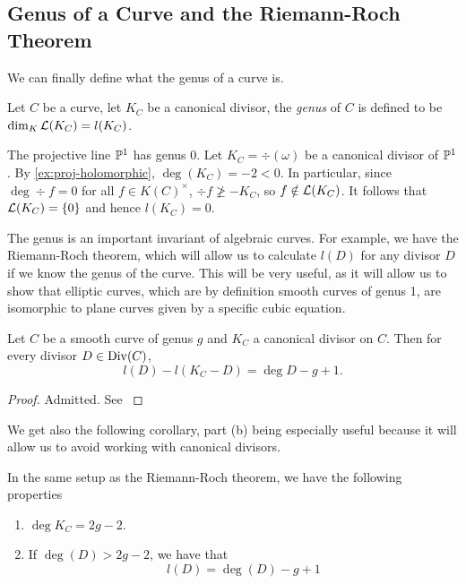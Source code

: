 \subsection{Genus of a Curve and the Riemann-Roch Theorem}

We can finally define what the genus of a curve is.
\begin{definition}
	Let $C$ be a curve, let $K_C$ be a canonical divisor,
	the \emph{genus} of $C$ is defined to be $\dim_K \mathcal{L}(K_C) = l(K_C)$.
\end{definition}

\begin{example}
	\label{ex:proj-genus}
	The projective line $\mathbb{P}^1$ has genus 0.
	Let $K_C = \div(\omega)$ be a canonical divisor of $\mathbb{P}^1$.
	By \ref{ex:proj-holomorphic}, $\deg(K_C) = -2 < 0$. In particular, 
	since $\deg \div f = 0$ for all $f \in K(C)^\times$,
	$\div f \not\geq -K_C$,
	so $f \notin \mathcal{L}(K_C)$. It follows that $\mathcal{L}(K_C) = \{0\}$ and
	hence $l(K_C) = 0$.
\end{example}

The genus is an important invariant of algebraic curves.
For example, we have the Riemann-Roch theorem, which will
allow us to calculate $l(D)$ for any divisor $D$ if we know the genus of
the curve.
This will be very useful, as it will allow us to show that elliptic curves,
which are by definition smooth curves of genus 1, are
isomorphic to plane curves given by a specific cubic equation.
\begin{theorem}
	\label{thm:riemann-roch}
	Let $C$ be a smooth curve of genus $g$ and $K_C$ a
	canonical divisor on $C$.
	Then for every divisor $D \in \operatorname{Div}(C)$,
	\begin{equation*}
		l(D) - l(K_C - D) = \deg D - g + 1.
	\end{equation*}
\end{theorem}
\begin{proof}
	Admitted. See \cite[IV.1.3]{hartshorne}
\end{proof}

We get also the following corollary, part (b) being especially useful
because it will allow us to avoid working
with canonical divisors.

\begin{corollary}
	\label{cor:riemann-roch}
	In the same setup as the Riemann-Roch theorem, we have the following properties
	\begin{enumerate}[itemsep=0em, label=(\alph*)]
		\item $\deg K_C = 2g - 2$.
		\item If $\deg(D) > 2g - 2$, we have that
			\begin{equation*}
				l(D) = \deg(D) - g + 1
			\end{equation*}	
	\end{enumerate}
\end{corollary}

